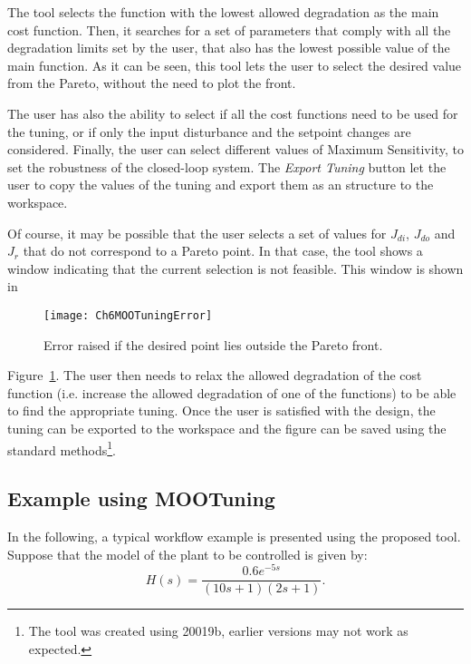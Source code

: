 The tool selects the function with the lowest allowed degradation as the main cost function. Then, it searches for a set of parameters that comply with all the degradation limits set by the user, that also has the lowest possible value of the main function. As it can be seen, this tool lets the user to select the desired value from the Pareto, without the need to plot the front.

The user has also the ability to select if all the cost functions need to be used for the tuning, or if only the input disturbance and the setpoint changes are considered. Finally, the user can select different values of Maximum Sensitivity, to set the robustness of the closed-loop system. The \textit{Export Tuning} button let the user to copy the values of the tuning and export them as an structure to the \matlab{} workspace.

Of course, it may be possible that the user selects a set of values for $J_{di}$, $J_{do}$ and $J_r$ that do not correspond to a Pareto point. In that case, the tool shows a window indicating that the current selection is not feasible. This window is shown in %
%
\begin{figure}[tb]
	\centering
	\texttt{[image: Ch6MOOTuningError]}
	\caption{Error raised if the desired point lies outside the Pareto front.}
	\label{fig:Ch6MOOTuningError}
\end{figure}
%
Figure~\ref{fig:Ch6MOOTuningError}. The user then needs to relax the allowed degradation of the cost function (i.e. increase the allowed degradation of one of the functions) to be able to find the appropriate tuning. Once the user is satisfied with the design, the tuning can be exported to the \matlab{} workspace and the figure can be saved using the standard \matlab{} methods\footnote{The tool was created using \matlab{} 20019b, earlier versions may not work as expected.}.

\subsection{Example using MOOTuning}
\label{sec:MOOTuningExample}
In the following, a typical workflow example is presented using the proposed tool. Suppose that the model of the plant to be controlled is given by:
\begin{equation}
	H(s) = \frac{0.6 e^{-5s}}{(10 s + 1)(2 s +1)}.
	\label{eq:ModeloEjemploMOO}
\end{equation}

